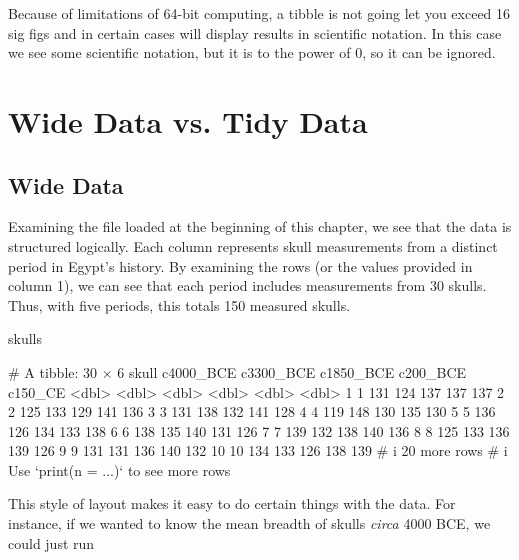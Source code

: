 Because of limitations of 64-bit computing, a tibble is not going let you exceed 16 sig figs and in certain cases will display results in scientific notation. In this case we see some scientific notation, but it is to the power of 0, so it can be ignored.

\section{Wide Data vs. Tidy Data}

\subsection{Wide Data}
\label{sec:wide_data}

Examining the  file loaded at the beginning of this chapter, we see that the data is structured logically. Each column represents skull measurements from a distinct period in Egypt’s history. By examining the rows (or the values provided in column 1), we can see that each period includes measurements from 30 skulls. Thus, with five periods, this totals 150 measured skulls.

\begin{inR}
skulls
\end{inR}

\begin{outR}
# A tibble: 30 × 6
   skull c4000_BCE c3300_BCE c1850_BCE c200_BCE c150_CE
   <dbl>     <dbl>     <dbl>     <dbl>    <dbl>   <dbl>
 1     1       131       124       137      137     137
 2     2       125       133       129      141     136
 3     3       131       138       132      141     128
 4     4       119       148       130      135     130
 5     5       136       126       134      133     138
 6     6       138       135       140      131     126
 7     7       139       132       138      140     136
 8     8       125       133       136      139     126
 9     9       131       131       136      140     132
10    10       134       133       126      138     139
# i 20 more rows
# i Use `print(n = ...)` to see more rows
\end{outR}

This style of layout makes it easy to do certain things with the data. For instance, if we wanted to know the mean breadth of skulls \textit{circa} 4000 BCE, we could just run 


